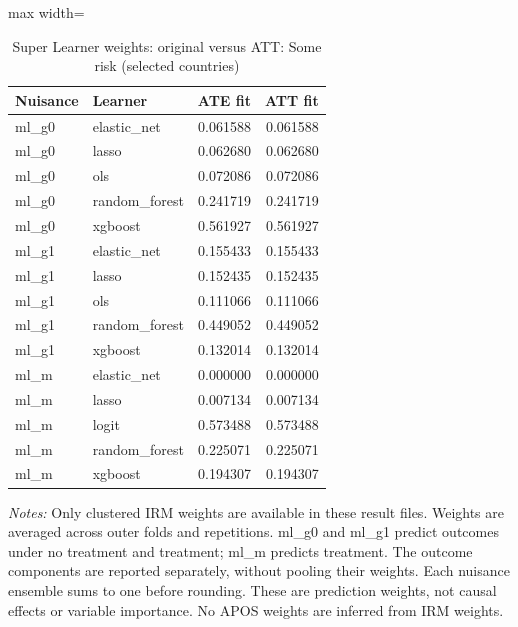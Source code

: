 \begin{table}[htbp]
\centering\scriptsize
\caption{Super Learner weights: original versus ATT: Some risk (selected countries)}
\label{tab:table-ate-att-convex-weights-SomeRiskHome-selected-countries}
\begin{adjustbox}{max width=\linewidth}
\begin{tabular}{llrr}
\toprule
Nuisance & Learner & ATE fit & ATT fit \\
\midrule
ml\_g0 & elastic\_net & 0.061588 & 0.061588 \\
ml\_g0 & lasso & 0.062680 & 0.062680 \\
ml\_g0 & ols & 0.072086 & 0.072086 \\
ml\_g0 & random\_forest & 0.241719 & 0.241719 \\
ml\_g0 & xgboost & 0.561927 & 0.561927 \\
ml\_g1 & elastic\_net & 0.155433 & 0.155433 \\
ml\_g1 & lasso & 0.152435 & 0.152435 \\
ml\_g1 & ols & 0.111066 & 0.111066 \\
ml\_g1 & random\_forest & 0.449052 & 0.449052 \\
ml\_g1 & xgboost & 0.132014 & 0.132014 \\
ml\_m & elastic\_net & 0.000000 & 0.000000 \\
ml\_m & lasso & 0.007134 & 0.007134 \\
ml\_m & logit & 0.573488 & 0.573488 \\
ml\_m & random\_forest & 0.225071 & 0.225071 \\
ml\_m & xgboost & 0.194307 & 0.194307 \\
\bottomrule
\end{tabular}
\end{adjustbox}
\par\vspace{3pt}\begin{minipage}{\linewidth}\scriptsize\textit{Notes:} Only clustered IRM weights are available in these result files. Weights are averaged across outer folds and repetitions. ml\_g0 and ml\_g1 predict outcomes under no treatment and treatment; ml\_m predicts treatment. The outcome components are reported separately, without pooling their weights. Each nuisance ensemble sums to one before rounding. These are prediction weights, not causal effects or variable importance. No APOS weights are inferred from IRM weights.\end{minipage}
\end{table}
